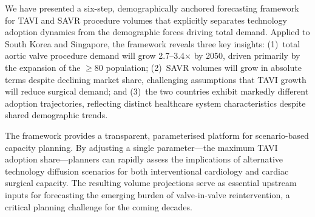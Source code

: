 \documentclass[12pt, a4paper]{article}
\begin{document}
We have presented a six-step, demographically anchored forecasting framework for TAVI and SAVR procedure volumes that explicitly separates technology adoption dynamics from the demographic forces driving total demand. Applied to South Korea and Singapore, the framework reveals three key insights: (1)~total aortic valve procedure demand will grow 2.7--3.4$\times$ by 2050, driven primarily by the expansion of the $\geq$80 population; (2)~SAVR volumes will grow in absolute terms despite declining market share, challenging assumptions that TAVI growth will reduce surgical demand; and (3)~the two countries exhibit markedly different adoption trajectories, reflecting distinct healthcare system characteristics despite shared demographic trends.

The framework provides a transparent, parameterised platform for scenario-based capacity planning. By adjusting a single parameter---the maximum TAVI adoption share---planners can rapidly assess the implications of alternative technology diffusion scenarios for both interventional cardiology and cardiac surgical capacity. The resulting volume projections serve as essential upstream inputs for forecasting the emerging burden of valve-in-valve reintervention, a critical planning challenge for the coming decades.


% 
% 
\end{document}
